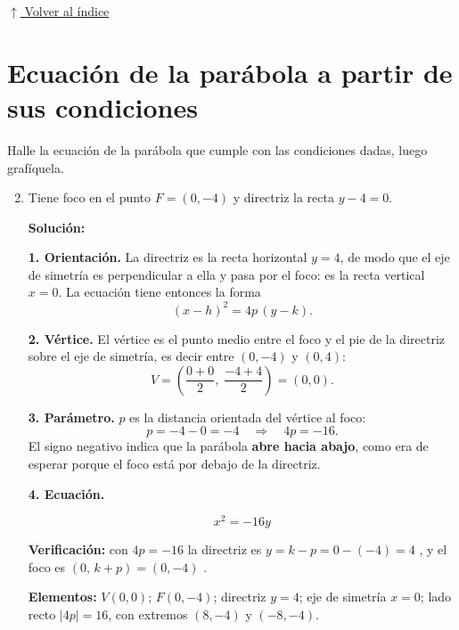 \documentclass[12pt]{article}
\newcommand{\solucion}{%
    \vspace{0.8em}%
    \textbf{Solución:}%
    \vspace{0.8em}%
}
\newcommand{\volverindice}{%
    \vspace{1em}%
    \begin{flushright}%
        \hyperlink{indice}{\small $\uparrow$ Volver al índice}%
    \end{flushright}%
}
\begin{document}
\volverindice
\newpage


\section{Ecuación de la parábola a partir de sus condiciones}

Halle la ecuación de la parábola que cumple con las condiciones dadas, luego
grafíquela.

\begin{enumerate}[label=\alph*.-]

    \setcounter{enumi}{1} %

    \item Tiene foco en el punto $F=(0,-4)$ y directriz la recta $y-4=0$.

    \solucion

    \textbf{1. Orientación.} La directriz es la recta horizontal $y=4$, de modo
    que el eje de simetría es perpendicular a ella y pasa por el foco: es la
    recta vertical $x=0$. La ecuación tiene entonces la forma
    \[
    (x-h)^{2}=4p\,(y-k).
    \]

    \textbf{2. Vértice.} El vértice es el punto medio entre el foco y el pie de
    la directriz sobre el eje de simetría, es decir entre $(0,-4)$ y $(0,4)$:
    \[
    V=\left(\frac{0+0}{2},\;\frac{-4+4}{2}\right)=(0,0).
    \]

    \textbf{3. Parámetro.} $p$ es la distancia orientada del vértice al foco:
    \[
    p=-4-0=-4
    \quad\Longrightarrow\quad
    4p=-16 .
    \]
    El signo negativo indica que la parábola \textbf{abre hacia abajo}, como era
    de esperar porque el foco está por debajo de la directriz.

    \textbf{4. Ecuación.}

    \[
    \boxed{
    x^{2}=-16y
    }
    \]

    \textbf{Verificación:} con $4p=-16$ la directriz es $y=k-p=0-(-4)=4$
    \checkmark, y el foco es $(0,\,k+p)=(0,-4)$ \checkmark.

    \textbf{Elementos:} $V(0,0)$; $F(0,-4)$; directriz $y=4$; eje de simetría
    $x=0$; lado recto $|4p|=16$, con extremos $(8,-4)$ y $(-8,-4)$.


\end{enumerate}
\end{document}
